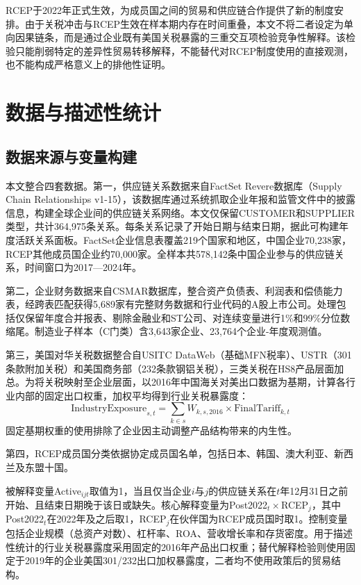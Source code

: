 \documentclass[12pt,a4paper]{ctexart}
\begin{document}
RCEP于2022年正式生效，为成员国之间的贸易和供应链合作提供了新的制度安排。由于关税冲击与RCEP生效在样本期内存在时间重叠，本文不将二者设定为单向因果链条，而是通过企业既有美国关税暴露的三重交互项检验竞争性解释。该检验只能削弱特定的差异性贸易转移解释，不能替代对RCEP制度使用的直接观测，也不能构成严格意义上的排他性证明。


\section{数据与描述性统计}

\subsection{数据来源与变量构建}

本文整合四套数据。第一，供应链关系数据来自FactSet Revere数据库（Supply Chain Relationships v1-15），该数据库通过系统抓取企业年报和监管文件中的披露信息，构建全球企业间的供应链关系网络。本文仅保留CUSTOMER和SUPPLIER类型，共计364,975条关系。每条关系记录了开始日期与结束日期，据此可构建年度活跃关系面板。FactSet企业信息表覆盖219个国家和地区，中国企业70,238家，RCEP其他成员国企业约70,000家。全样本共578,142条中国企业参与的供应链关系，时间窗口为2017—2024年。

第二，企业财务数据来自CSMAR数据库，整合资产负债表、利润表和偿债能力表，经跨表匹配获得5,689家有完整财务数据和行业代码的A股上市公司。处理包括仅保留年度合并报表、剔除金融业和ST公司、对连续变量进行1\%和99\%分位数缩尾。制造业子样本（C门类）含3,643家企业、23,764个企业-年度观测值。

第三，美国对华关税数据整合自USITC DataWeb（基础MFN税率）、USTR（301条款附加关税）和美国商务部（232条款钢铝关税），三类关税在HS8产品层面加总。为将关税映射至企业层面，以2016年中国海关对美出口数据为基期，计算各行业内部的固定出口权重，加权平均得到行业关税暴露度：
\begin{equation}
\text{IndustryExposure}_{s,t} = \sum_{k \in s} W_{k,s,2016} \times \text{FinalTariff}_{k,t}
\end{equation}
固定基期权重的使用排除了企业因主动调整产品结构带来的内生性。

第四，RCEP成员国分类依据协定成员国名单，包括日本、韩国、澳大利亚、新西兰及东盟十国。

被解释变量Active$_{ijt}$取值为1，当且仅当企业$i$与$j$的供应链关系在$t$年12月31日之前开始、且结束日期晚于该日或缺失。核心解释变量为Post2022$_t\times$RCEP$_j$，其中Post2022$_t$在2022年及之后取1，RCEP$_j$在伙伴国为RCEP成员国时取1。控制变量包括企业规模（总资产对数）、杠杆率、ROA、营收增长率和存货密度。用于描述性统计的行业关税暴露度采用固定的2016年产品出口权重；替代解释检验则使用固定于2019年的企业美国301/232出口加权暴露度，二者均不使用政策后的贸易结构。
\end{document}
